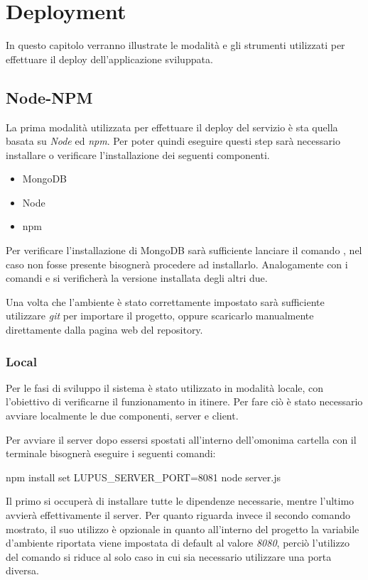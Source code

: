 \chapter{Deployment}
In questo capitolo verranno illustrate le modalità e gli strumenti utilizzati per effettuare il deploy dell'applicazione sviluppata.

\section{Node-NPM}
La prima modalità utilizzata per effettuare il deploy del servizio è sta quella basata su \emph{Node} ed \emph{npm}. Per poter quindi eseguire questi step sarà necessario installare o verificare l'installazione dei seguenti componenti.
\begin{itemize}
    \item MongoDB
    \item Node
    \item npm
\end{itemize}
Per verificare l'installazione di MongoDB sarà sufficiente lanciare il comando , nel caso non fosse presente bisognerà procedere ad installarlo. Analogamente con i comandi  e  si verificherà la versione installata degli altri due.

Una volta che l'ambiente è stato correttamente impostato sarà sufficiente utilizzare \emph{git} per importare il progetto, oppure scaricarlo manualmente direttamente dalla pagina web del repository.

\subsection{Local}
Per le fasi di sviluppo il sistema è stato utilizzato in modalità locale, con l'obiettivo di verificarne il funzionamento in itinere. Per fare ciò è stato necessario avviare localmente le due componenti, server e client.

Per avviare il server dopo essersi spostati all'interno dell'omonima cartella con il terminale bisognerà eseguire i seguenti comandi:

\begin{lcverbatim}
    npm install
    set LUPUS_SERVER_PORT=8081
    node server.js
\end{lcverbatim}

Il primo si occuperà di installare tutte le dipendenze necessarie, mentre l'ultimo avvierà effettivamente il server. Per quanto riguarda invece il secondo comando mostrato, il suo utilizzo è opzionale in quanto all'interno del progetto la variabile d'ambiente riportata viene impostata di default al valore \emph{8080}, perciò l'utilizzo del comando si riduce al solo caso in cui sia necessario utilizzare una porta diversa.

